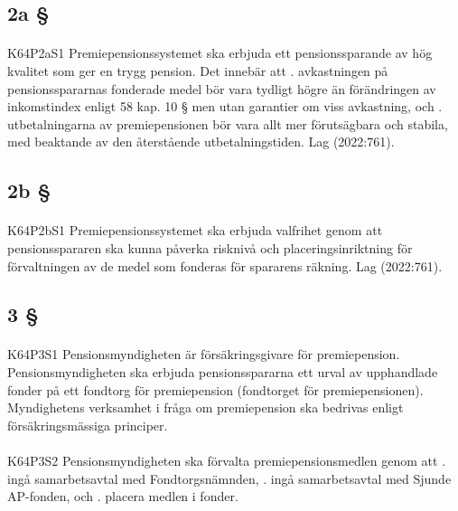 \documentclass[a4paper,notitlepage,openany,10pt]{book}
\begin{document}
\subsection*{2a §}
\paragraph*{}
{\tiny K64P2aS1}
Premiepensionssystemet ska erbjuda ett pensionssparande av hög kvalitet som ger en trygg pension. Det innebär att
. avkastningen på pensionsspararnas fonderade medel bör vara tydligt högre än förändringen av inkomstindex enligt 58 kap. 10 § men utan garantier om viss avkastning, och
. utbetalningarna av premiepensionen bör vara allt mer förutsägbara och stabila, med beaktande av den återstående utbetalningstiden.
Lag (2022:761).
\subsection*{2b §}
\paragraph*{}
{\tiny K64P2bS1}
Premiepensionssystemet ska erbjuda valfrihet genom att pensionsspararen ska kunna påverka risknivå och placeringsinriktning för förvaltningen av de medel som fonderas för spararens räkning.
Lag (2022:761).
\subsection*{3 §}
\paragraph*{}
{\tiny K64P3S1}
Pensionsmyndigheten är försäkringsgivare för premiepension. Pensionsmyndigheten ska erbjuda pensionsspararna ett urval av upphandlade fonder på ett fondtorg för premiepension (fondtorget för premiepensionen). Myndighetens verksamhet i fråga om premiepension ska bedrivas enligt försäkringsmässiga principer.
\paragraph*{}
{\tiny K64P3S2}
Pensionsmyndigheten ska förvalta premiepensionsmedlen genom att
. ingå samarbetsavtal med Fondtorgsnämnden,
. ingå samarbetsavtal med Sjunde AP-fonden, och
. placera medlen i fonder.
\end{document}
